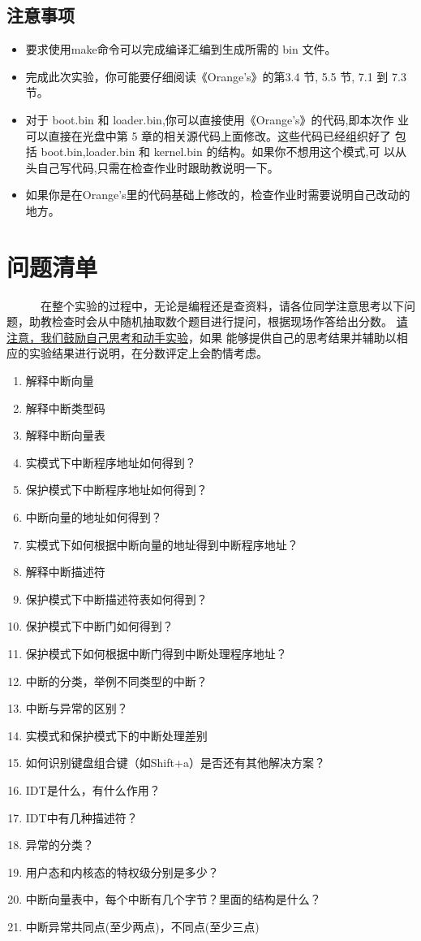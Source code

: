 \documentclass[a4paper]{article}
\begin{document}
\subsection{注意事项}
	\begin{itemize}
		\item 要求使用make命令可以完成编译汇编到生成所需的 bin 文件。
		\item 完成此次实验，你可能要仔细阅读《Orange’s》的第3.4 节, 5.5 节, 7.1 到 7.3 节。
		\item 对于 boot.bin 和 loader.bin,你可以直接使用《Orange’s》的代码,即本次作
业可以直接在光盘中第 5 章的相关源代码上面修改。这些代码已经组织好了 包括 boot.bin,loader.bin 和 kernel.bin 的结构。如果你不想用这个模式,可 以从头自己写代码,只需在检查作业时跟助教说明一下。
		\item 如果你是在Orange's里的代码基础上修改的，检查作业时需要说明自己改动的地方。
	\end{itemize}

\section{问题清单}
~~~~~~在整个实验的过程中，无论是编程还是查资料，请各位同学注意思考以下问题，助教检查时会从中随机抽取数个题目进行提问，根据现场作答给出分数。
\underline{请注意，我们鼓励自己思考和动手实验}，如果
能够提供自己的思考结果并辅助以相应的实验结果进行说明，在分数评定上会酌情考虑。

\begin{enumerate}
	\item 解释中断向量
	\item 解释中断类型码
	\item 解释中断向量表
	\item 实模式下中断程序地址如何得到？
	\item 保护模式下中断程序地址如何得到？
	\item 中断向量的地址如何得到？
	\item 实模式下如何根据中断向量的地址得到中断程序地址？
	\item 解释中断描述符
	\item 保护模式下中断描述符表如何得到？
	\item 保护模式下中断门如何得到？
	\item 保护模式下如何根据中断门得到中断处理程序地址？
	\item 中断的分类，举例不同类型的中断？
	\item 中断与异常的区别？
	\item 实模式和保护模式下的中断处理差别
	\item 如何识别键盘组合键（如Shift+a）是否还有其他解决方案？
	\item IDT是什么，有什么作用？
	\item IDT中有几种描述符？
	\item 异常的分类？
	\item 用户态和内核态的特权级分别是多少？
	\item 中断向量表中，每个中断有几个字节？里面的结构是什么？
	\item 中断异常共同点(至少两点)，不同点(至少三点)
\end{enumerate}
\end{document}
